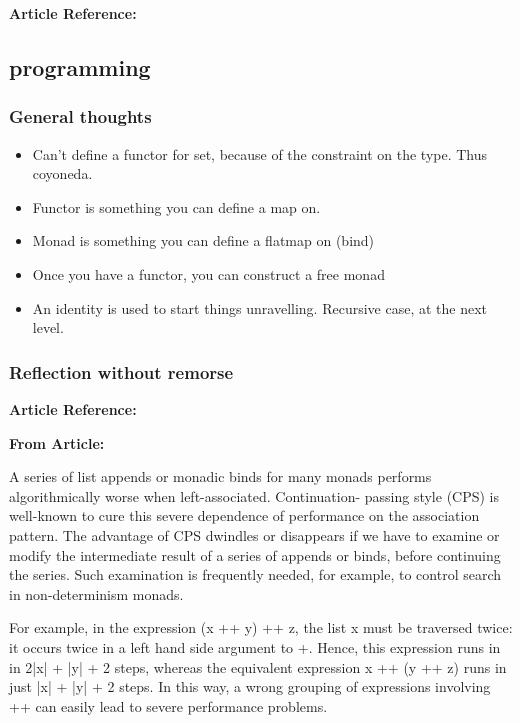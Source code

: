 \documentclass{article}
\begin{document}
\textbf{Article Reference:} \cite{2011arXiv1109.4850P}

\subsection{programming}

\subsubsection{General thoughts}

\begin{itemize}
  \item Can't define a functor for set, because of the constraint on the type. Thus coyoneda. 
  \item Functor is something you can define a map on. 
  \item Monad is something you can define a flatmap on (bind)
  \item Once you have a functor, you can construct a free monad
  \item An identity is used to start things unravelling. Recursive case, at the next level. 
\end{itemize}

\subsubsection{Reflection without remorse}

\textbf{Article Reference:} \cite{conf/haskell/PloegKiselyov14}

\textbf{From Article:}

A series of list appends or monadic binds for many monads performs algorithmically worse when left-associated. Continuation- passing style (CPS) is well-known to cure this severe dependence of performance on the association pattern. The advantage of CPS dwindles or disappears if we have to examine or modify the intermediate result of a series of appends or binds, before continuing the series. Such examination is frequently needed, for example, to control search in non-determinism monads.

For example, in the expression (x ++ y) ++ z, the list x must be traversed twice: it occurs twice in a left hand side argument to +. Hence, this expression runs in in 2|x| + |y| + 2 steps, whereas the equivalent expression x ++ (y ++ z) runs in just |x| + |y| + 2 steps. In this way, a wrong grouping of expressions involving ++ can easily lead to severe performance problems. 
\end{document}
